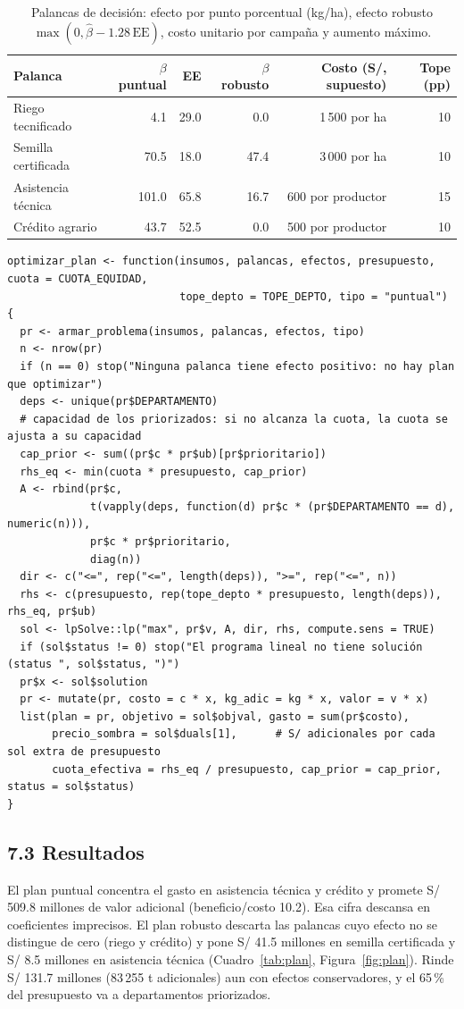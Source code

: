 \documentclass[letterpaper]{report}
\begin{document}
\begin{article}
\begin{table}[htbp]
\centering
\small
\caption{Palancas de decisión: efecto por punto porcentual (kg/ha), efecto robusto $\max(0,\hat\beta-1.28\,\mathrm{EE})$, costo unitario por campaña y aumento máximo.}\label{tab:palancas}
\begin{tabular}{lrrrrr}
\toprule
Palanca & $\beta$ puntual & EE & $\beta$ robusto & Costo (S/, supuesto) & Tope (pp) \\
\midrule
Riego tecnificado & 4.1 & 29.0 & 0.0 & 1\,500 por ha & 10 \\
Semilla certificada & 70.5 & 18.0 & 47.4 & 3\,000 por ha & 10 \\
Asistencia técnica & 101.0 & 65.8 & 16.7 & 600 por productor & 15 \\
Crédito agrario & 43.7 & 52.5 & 0.0 & 500 por productor & 10 \\
\bottomrule
\end{tabular}
\end{table}
\begin{Verbatim}[fontsize=\scriptsize, frame=single, framesep=2mm, label={\small Programa lineal con lpSolve}]
optimizar_plan <- function(insumos, palancas, efectos, presupuesto, cuota = CUOTA_EQUIDAD,
                           tope_depto = TOPE_DEPTO, tipo = "puntual") {
  pr <- armar_problema(insumos, palancas, efectos, tipo)
  n <- nrow(pr)
  if (n == 0) stop("Ninguna palanca tiene efecto positivo: no hay plan que optimizar")
  deps <- unique(pr$DEPARTAMENTO)
  # capacidad de los priorizados: si no alcanza la cuota, la cuota se ajusta a su capacidad
  cap_prior <- sum((pr$c * pr$ub)[pr$prioritario])
  rhs_eq <- min(cuota * presupuesto, cap_prior)
  A <- rbind(pr$c,
             t(vapply(deps, function(d) pr$c * (pr$DEPARTAMENTO == d), numeric(n))),
             pr$c * pr$prioritario,
             diag(n))
  dir <- c("<=", rep("<=", length(deps)), ">=", rep("<=", n))
  rhs <- c(presupuesto, rep(tope_depto * presupuesto, length(deps)), rhs_eq, pr$ub)
  sol <- lpSolve::lp("max", pr$v, A, dir, rhs, compute.sens = TRUE)
  if (sol$status != 0) stop("El programa lineal no tiene solución (status ", sol$status, ")")
  pr$x <- sol$solution
  pr <- mutate(pr, costo = c * x, kg_adic = kg * x, valor = v * x)
  list(plan = pr, objetivo = sol$objval, gasto = sum(pr$costo),
       precio_sombra = sol$duals[1],      # S/ adicionales por cada sol extra de presupuesto
       cuota_efectiva = rhs_eq / presupuesto, cap_prior = cap_prior, status = sol$status)
}
\end{Verbatim}
\subsection{7.3 Resultados}
El plan puntual concentra el gasto en asistencia técnica y crédito y promete S/ 509.8 millones de valor adicional (beneficio/costo 10.2). Esa cifra descansa en coeficientes imprecisos. El plan robusto descarta las palancas cuyo efecto no se distingue de cero (riego y crédito) y pone S/ 41.5 millones en semilla certificada y S/ 8.5 millones en asistencia técnica (Cuadro~\ref{tab:plan}, Figura~\ref{fig:plan}). Rinde S/ 131.7 millones (83\,255 t adicionales) aun con efectos conservadores, y el 65\,\% del presupuesto va a departamentos priorizados.


\end{article}
\end{document}
